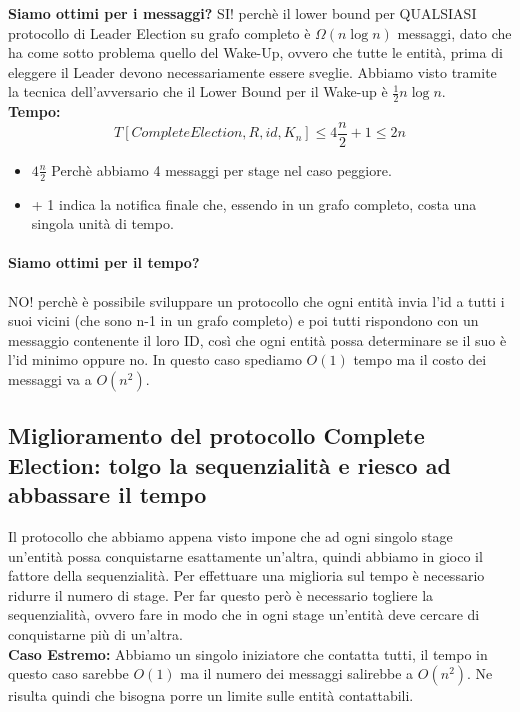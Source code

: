 \textbf{Siamo ottimi per i messaggi?}
SI! perchè il lower bound per QUALSIASI protocollo di Leader Election su grafo
completo è $\Omega(n \log n)$ messaggi, dato che ha come sotto problema quello
del Wake-Up, ovvero che tutte le entità, prima di eleggere il Leader devono
necessariamente essere sveglie. Abbiamo visto tramite la tecnica dell'avversario
che il Lower Bound per il Wake-up è $\frac{1}{2}n \log n$.\\


\textbf{Tempo:}\\ $$T[CompleteElection, R, id, K_n] \leq 4 \frac{n}{2} + 1 \leq
    2 n$$
\begin{itemize}
    \item $ 4 \frac{n}{2} $ Perchè abbiamo 4 messaggi per stage nel caso peggiore.
    \item + 1 indica la notifica finale che, essendo in un grafo completo, costa
          una singola unità di tempo.
\end{itemize}

\paragraph{Siamo ottimi per il tempo?} NO! perchè è possibile sviluppare un
protocollo che ogni entità invia l'id a tutti i suoi vicini (che sono n-1 in un
grafo completo) e poi tutti rispondono con un messaggio contenente il loro ID,
così che ogni entità possa determinare se il suo è l'id minimo oppure no. In
questo caso spediamo $O(1)$ tempo ma il costo dei messaggi va a $O(n^2)$.

\subsection{Miglioramento del protocollo Complete Election: tolgo la sequenzialità e riesco ad abbassare il tempo}
Il protocollo che abbiamo appena visto impone che ad ogni singolo stage
un'entità possa conquistarne esattamente un'altra, quindi abbiamo in gioco il
fattore della sequenzialità. Per effettuare una miglioria sul tempo è necessario
ridurre il numero di stage. Per far questo però è necessario togliere la
sequenzialità, ovvero fare in modo che in ogni stage un'entità deve cercare di
conquistarne più di un'altra.\\

\textbf{Caso Estremo:} Abbiamo un singolo iniziatore che contatta tutti, il
tempo in questo caso sarebbe $O(1)$ ma il numero dei messaggi salirebbe a
$O(n^2)$. Ne risulta quindi che bisogna porre un limite sulle entità
contattabili.\\

